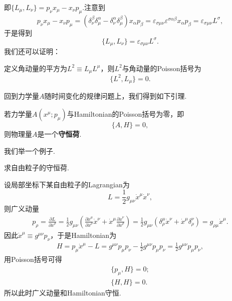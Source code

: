 		即$\{L_\mu,L_\nu\}=p_\nu x_\mu-x_\nu p_\mu$.注意到
		$$p_\nu x_\mu-x_\nu p_\mu=\left(\delta^\beta_\nu\delta^\alpha_\mu-\delta^\alpha_\nu\delta^\beta_\mu\right)x_\alpha p_\beta=\varepsilon_{\sigma\mu\nu}\varepsilon^{\sigma\alpha\beta} x_\alpha p_\beta=\varepsilon_{\sigma\mu\nu}L^\sigma,$$
		于是得到
		\begin{equation}\label{eq:[L,L]}
			\{L_\mu,L_\nu\}=\varepsilon_{\sigma\mu\nu}L^\sigma.
		\end{equation}
		我们还可以证明：
		\begin{exercise}
			定义角动量的平方为$L^2\equiv L_\mu L^\mu$，则$L^2$与角动量的Poisson括号为
			\begin{equation}\label{eq:[L^2,L]}
				\{L^2,L_\mu\}=0.
			\end{equation}
		\end{exercise}
		回到力学量$A$随时间变化的规律问题上，我们得到如下引理.
		\begin{lemma}
		若力学量$A(x^\mu;p_\mu)$与Hamiltonian的Poisson括号为零，即
		\begin{equation}
			\{A,H\}=0,
		\end{equation}
		则物理量$A$是一个\textbf{守恒荷}.
		\end{lemma}
		我们举一个例子.
		\begin{example}
			求自由粒子的守恒荷.

		设局部坐标下某自由粒子的Lagrangian为
		$$L=\frac{1}{2}g_{\mu\nu}\dot{x}^\mu\dot{x}^\nu,$$
		则广义动量
		\begin{eqnarray*}
			p_\rho=\frac{\partial L}{\partial {\dot{x}}^\rho}=\frac{1}{2}g_{\mu\nu}\left(\frac{\partial \dot{x}^\mu}{\partial {\dot{x}}^\rho}\dot{x}^\nu+\dot{x}^\mu\frac{\partial \dot{x}^\nu}{\partial {\dot{x}}^\rho}\right)=\frac{1}{2}g_{\mu\nu}\left(\delta^\mu_\rho\dot{x}^\nu+\dot{x}^\mu\delta^\nu_\rho\right)=g_{\rho\mu}\dot{x}^\mu.
		\end{eqnarray*}
		因此$\dot{x}^\mu\equiv g^{\mu\nu}p_\nu$，于是Hamiltonian为
		\begin{eqnarray*}
			H=p_\mu{\dot{x}}^\mu-L=g^{\mu\nu}p_\mu p_\nu-\frac{1}{2}g^{\mu\nu}p_\mu p_\nu=\frac{1}{2}g^{\mu\nu}p_\mu p_\nu,
		\end{eqnarray*}
		用Poisson括号可得
		\begin{eqnarray*}
			\{p_\mu,H\}=0;\\
			\{H,H\}=0.
		\end{eqnarray*}	
		所以此时广义动量和Hamiltonian守恒.
		\end{example}
	
	
